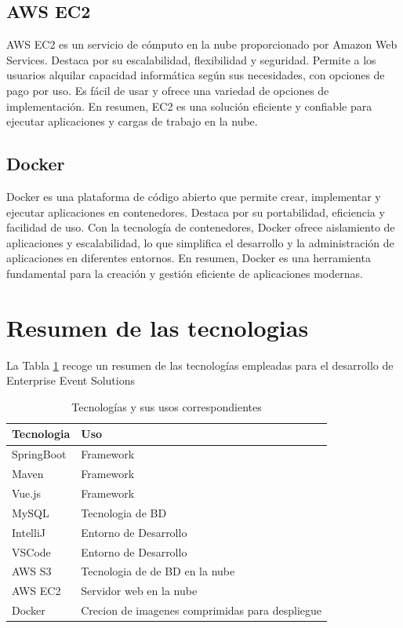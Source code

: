 \subsection{AWS EC2}
AWS EC2 es un servicio de cómputo en la nube proporcionado por Amazon Web Services. Destaca por su escalabilidad, flexibilidad y seguridad. 
Permite a los usuarios alquilar capacidad informática según sus necesidades, con opciones de pago por uso. Es fácil de usar y ofrece una variedad 
de opciones de implementación. En resumen, EC2 es una solución eficiente y confiable para ejecutar aplicaciones y cargas de trabajo en la nube.

\subsection{Docker}
Docker es una plataforma de código abierto que permite crear, implementar y ejecutar aplicaciones en contenedores. Destaca por su portabilidad, 
eficiencia y facilidad de uso. Con la tecnología de contenedores, Docker ofrece aislamiento de aplicaciones y escalabilidad, lo que simplifica el 
desarrollo y la administración de aplicaciones en diferentes entornos. En resumen, Docker es una herramienta fundamental para la creación y gestión 
eficiente de aplicaciones modernas.

\newpage
\section{Resumen de las tecnologias}
La Tabla \ref{tabla:tecnologias_usos} recoge un resumen de las tecnologías empleadas para el desarrollo de Enterprise Event Solutions
\begin{table}[h]
\begin{tabular}{ p{3cm} l  }

    \hline
    Tecnologia& Uso \\
    \hline
    SpringBoot   & Framework \\
    Maven &   Framework \\
    Vue.js & Framework  \\
    MySQL    & Tecnologia de BD \\
    IntelliJ&   Entorno de Desarrollo  \\
    VSCode& Entorno de Desarrollo \\
    AWS S3& Tecnologia de de BD en la nube  \\
    AWS EC2& Servidor web en la nube  \\
    Docker& Crecion de imagenes comprimidas para despliegue  \\
    \hline
   \end{tabular}
   \caption{Tecnologías y sus usos correspondientes}
   \label{tabla:tecnologias_usos}
\end{table}
\newpage

